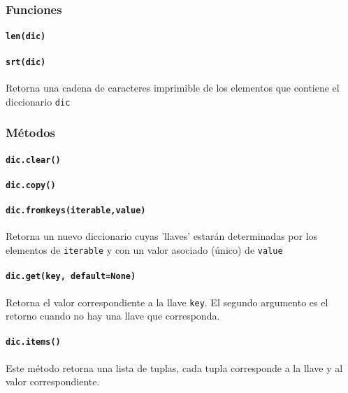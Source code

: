 \subsubsection{Funciones}

\paragraph{\texttt{len(dic)}}

\paragraph{\texttt{srt(dic)}} Retorna una cadena de caracteres imprimible de los elementos que contiene el diccionario \texttt{dic}


\subsubsection{Métodos}

\paragraph{\texttt{dic.clear()}}

\paragraph{\texttt{dic.copy()}}

\paragraph{\texttt{dic.fromkeys(iterable,value)}} Retorna un nuevo diccionario cuyas 'llaves' estarán determinadas por los elementos de \texttt{iterable} y con un valor asociado (único) de \texttt{value}

\paragraph{\texttt{dic.get(key, default=None)}} Retorna el valor correspondiente a la llave \texttt{key}. El segundo argumento es el retorno cuando no hay una llave que corresponda.

\paragraph{\texttt{dic.items()}} Este método retorna una lista de tuplas, cada tupla corresponde a la llave y al valor correspondiente.

